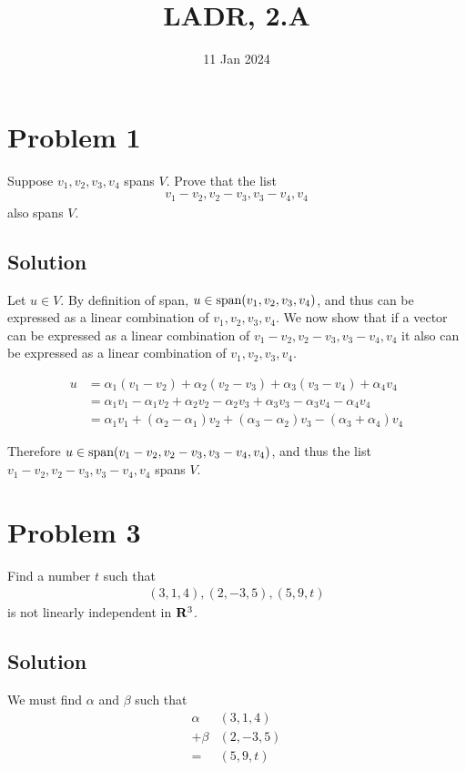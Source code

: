 \documentclass{article}
\title{LADR, 2.A}
\date{11 Jan 2024}
\begin{document}
\maketitle

\section*{Problem 1}
Suppose $v_1, v_2, v_3, v_4$ spans $V$. Prove that the list
\begin{align*}
    v_1-v_2, v_2-v_3, v_3-v_4, v_4
\end{align*}
also spans $V$.

\subsection*{Solution}
Let $u\in V$. By definition of span, $u\in\text{span}(v_1, v_2, v_3, v_4)$, and thus can be expressed as a linear combination of $v_1, v_2, v_3, v_4$. We now show that if a vector can be expressed as a linear combination of $v_1-v_2, v_2-v_3, v_3-v_4, v_4$ it also can be expressed as a linear combination of $v_1, v_2, v_3, v_4$.

\begin{align*}
    u&=\alpha_1(v_1-v_2) + \alpha_2(v_2-v_3) + \alpha_3(v_3-v_4) + \alpha_4 v_4 \\
    &= \alpha_1 v_1 - \alpha_1 v_2 + \alpha_2 v_2 - \alpha_2 v_3 + \alpha_3 v_3 - \alpha_3 v_4 - \alpha_4 v_4 \\
    &= \alpha_1 v_1 + (\alpha_2 - \alpha_1) v_2  + (\alpha_3 - \alpha_2) v_3 - (\alpha_3 + \alpha_4) v_4
\end{align*}

Therefore $u\in\text{span}(v_1-v_2, v_2-v_3, v_3-v_4, v_4)$, and thus the list $v_1-v_2, v_2-v_3, v_3-v_4, v_4$ spans $V$.

\section*{Problem 3}
Find a number $t$ such that
\begin{align*}
    (3, 1, 4), (2, -3, 5), (5, 9, t)
\end{align*}
is not linearly independent in $\mathbf{R}^3$.

\subsection*{Solution}
We must find $\alpha$ and $\beta$ such that
\begin{align*}
    \alpha&(3,1,4)\\
    + \beta&(2, -3, 5)\\
    = &(5, 9, t)
\end{align*}
\end{document}
